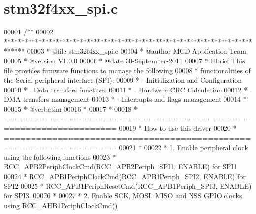 \section{stm32f4xx\+\_\+spi.\+c}
\label{stm32f4xx__spi_8c_source}

\begin{DoxyCode}
00001 \textcolor{comment}{/**}
00002 \textcolor{comment}{  ******************************************************************************}
00003 \textcolor{comment}{  * @file    stm32f4xx\_spi.c}
00004 \textcolor{comment}{  * @author  MCD Application Team}
00005 \textcolor{comment}{  * @version V1.0.0}
00006 \textcolor{comment}{  * @date    30-September-2011}
00007 \textcolor{comment}{  * @brief   This file provides firmware functions to manage the following }
00008 \textcolor{comment}{  *          functionalities of the Serial peripheral interface (SPI):}
00009 \textcolor{comment}{  *           - Initialization and Configuration}
00010 \textcolor{comment}{  *           - Data transfers functions}
00011 \textcolor{comment}{  *           - Hardware CRC Calculation}
00012 \textcolor{comment}{  *           - DMA transfers management}
00013 \textcolor{comment}{  *           - Interrupts and flags management }
00014 \textcolor{comment}{  *           }
00015 \textcolor{comment}{  *  @verbatim}
00016 \textcolor{comment}{  *          }
00017 \textcolor{comment}{  *                    }
00018 \textcolor{comment}{  *          ===================================================================}
00019 \textcolor{comment}{  *                                 How to use this driver}
00020 \textcolor{comment}{  *          ===================================================================}
00021 \textcolor{comment}{  *    }
00022 \textcolor{comment}{  *          1. Enable peripheral clock using the following functions }
00023 \textcolor{comment}{  *             RCC\_APB2PeriphClockCmd(RCC\_APB2Periph\_SPI1, ENABLE) for SPI1}
00024 \textcolor{comment}{  *             RCC\_APB1PeriphClockCmd(RCC\_APB1Periph\_SPI2, ENABLE) for SPI2}
00025 \textcolor{comment}{  *             RCC\_APB1PeriphResetCmd(RCC\_APB1Periph\_SPI3, ENABLE) for SPI3.}
00026 \textcolor{comment}{  *}
00027 \textcolor{comment}{  *          2. Enable SCK, MOSI, MISO and NSS GPIO clocks using RCC\_AHB1PeriphClockCmd()}

\end{DoxyCode}
